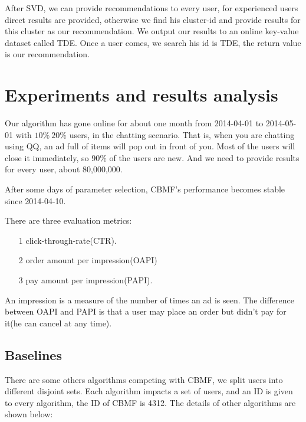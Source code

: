 After SVD, we can provide recommendations to every user, for experienced users direct results are provided, otherwise we find his cluster-id and provide results for this cluster as our recommendation. We output our results to an online key-value dataset called TDE. Once a user comes, we search his id is TDE, the return value is our recommendation.

\section{Experiments and results analysis}

Our algorithm has gone online for about one month from 2014-04-01 to 2014-05-01 with $10\%~20\%$ users, in the chatting scenario. That is, when you are chatting using QQ, an ad full of items will pop out in front of you. Most of the users will close it immediately, so $90\%$ of the users are new. And we need to provide results for every user, about 80,000,000.

After some days of parameter selection, CBMF's performance becomes stable since 2014-04-10.

There are three evaluation metrics: 
\begin{itemize}
\item [1] click-through-rate(CTR). 
\item [2] order amount per impression(OAPI)
\item [3] pay amount per impression(PAPI).
\end{itemize}

An impression is a measure of the number of times an ad is seen. The difference between OAPI and PAPI is that a user may place an order but didn't pay for it(he can cancel at any time).

\subsection{Baselines}

There are some others algorithms competing with CBMF, we split users into different disjoint sets. Each algorithm impacts a set of users, and an ID is given to every algorithm, the ID of CBMF is 4312. The details of other algorithms are shown below:


